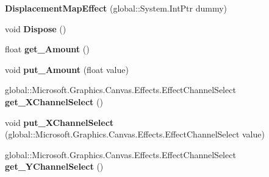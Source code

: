 \begin{DoxyCompactItemize}
{\bfseries Displacement\+Map\+Effect} (global\+::\+System.\+Int\+Ptr dummy)
\item 
\mbox{\label{class_microsoft_1_1_graphics_1_1_canvas_1_1_effects_1_1_displacement_map_effect_a3bc67d76982886e7a8944528ef1e212c}} 
void {\bfseries Dispose} ()
\item 
\mbox{\label{class_microsoft_1_1_graphics_1_1_canvas_1_1_effects_1_1_displacement_map_effect_ab9cf484fc72d3724bf8b3090cfadbdc0}} 
float {\bfseries get\+\_\+\+Amount} ()
\item 
\mbox{\label{class_microsoft_1_1_graphics_1_1_canvas_1_1_effects_1_1_displacement_map_effect_a778035a283ef8ab94cb70d3718c04523}} 
void {\bfseries put\+\_\+\+Amount} (float value)
\item 
\mbox{\label{class_microsoft_1_1_graphics_1_1_canvas_1_1_effects_1_1_displacement_map_effect_a9de6395612f22b140d32e3ca061cd2a5}} 
global\+::\+Microsoft.\+Graphics.\+Canvas.\+Effects.\+Effect\+Channel\+Select {\bfseries get\+\_\+\+X\+Channel\+Select} ()
\item 
\mbox{\label{class_microsoft_1_1_graphics_1_1_canvas_1_1_effects_1_1_displacement_map_effect_a17232b9afecc3a3387aba9aa88381baf}} 
void {\bfseries put\+\_\+\+X\+Channel\+Select} (global\+::\+Microsoft.\+Graphics.\+Canvas.\+Effects.\+Effect\+Channel\+Select value)
\item 
\mbox{\label{class_microsoft_1_1_graphics_1_1_canvas_1_1_effects_1_1_displacement_map_effect_a054ea7ca343451632990c0ba5745cb36}} 
global\+::\+Microsoft.\+Graphics.\+Canvas.\+Effects.\+Effect\+Channel\+Select {\bfseries get\+\_\+\+Y\+Channel\+Select} ()
\item 
\mbox{\label{class_microsoft_1_1_graphics_1_1_canvas_1_1_effects_1_1_displacement_map_effect_a16f640070ff4f567c8c7c530557b8c10}} 

\end{DoxyCompactItemize}
